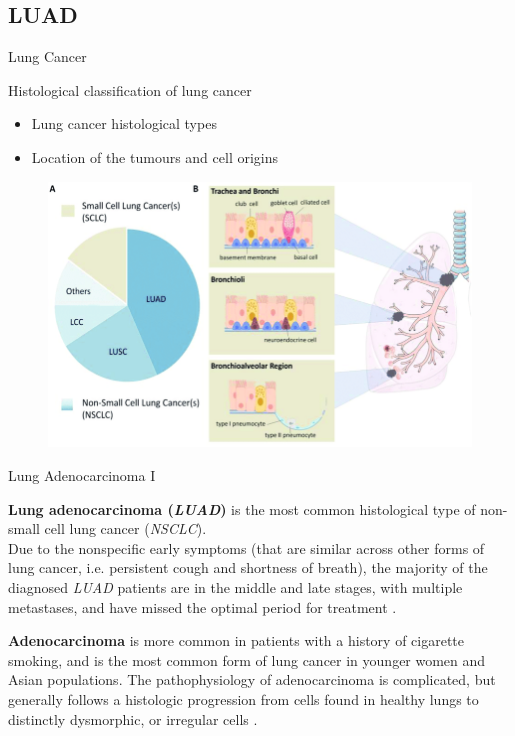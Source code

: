 \documentclass{beamer}
\begin{document}
\subsection{LUAD}
\begin{frame}{Lung Cancer}
  \begin{block}{Histological classification of lung cancer \cite{lungimage}}
    \begin{itemize}
      \item Lung cancer histological types
      \item Location of the tumours and cell origins
    \end{itemize}       
  \end{block}
  \pause
  \begin{figure}
    \centering
    \includegraphics[scale = 0.21]{img/Histological_Lung_Cancer.png}
  \end{figure}
\end{frame}
\begin{frame}{Lung Adenocarcinoma I}
  \begin{block}{}
    \textbf{Lung adenocarcinoma (\textit{LUAD})} is the most common histological
    type of non-small cell lung cancer (\textit{NSCLC}).\\ 
    Due to the nonspecific early symptoms (that are similar across other forms
    of lung cancer, i.e. persistent cough and shortness of breath), the majority
    of the diagnosed \textit{LUAD} patients are in the middle and late stages,
    with multiple metastases, and have missed the optimal period for treatment
    \cite{luadpot}.  
  \end{block}
  \pause
  \begin{block}{}
    \textbf{Adenocarcinoma} is more common in patients with a history of
    cigarette smoking, and is the most common form of lung cancer in younger
    women and Asian populations. The pathophysiology of adenocarcinoma is
    complicated, but generally follows a histologic progression from cells found
    in healthy lungs to distinctly dysmorphic, or irregular cells
    \cite{luadwiki}.  
  \end{block}
\end{frame}
\end{document}
